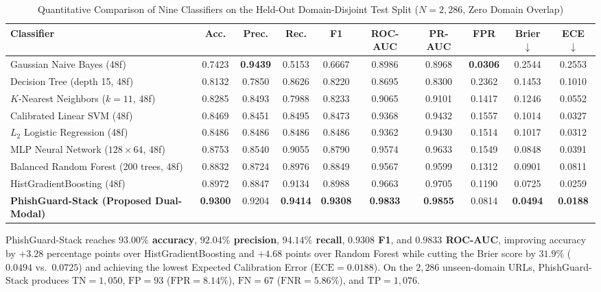 \documentclass[conference]{IEEEtran}
\begin{document}
\begin{table}[t]
\caption{Quantitative Comparison of Nine Classifiers on the Held-Out Domain-Disjoint Test Split ($N = 2{,}286$, Zero Domain Overlap)}
\label{tab:classifiers}
\centering
\footnotesize
\renewcommand{\arraystretch}{1.14}
\begin{tabular}{lccccccccc}
\toprule
\textbf{Classifier} & \textbf{Acc.} & \textbf{Prec.} & \textbf{Rec.} & \textbf{F1} & \textbf{ROC-AUC} & \textbf{PR-AUC} & \textbf{FPR} & \textbf{Brier $\downarrow$} & \textbf{ECE $\downarrow$} \\
\midrule
Gaussian Naive Bayes (48f) & 0.7423 & \textbf{0.9439} & 0.5153 & 0.6667 & 0.8986 & 0.8968 & \textbf{0.0306} & 0.2544 & 0.2553 \\
Decision Tree (depth 15, 48f) & 0.8132 & 0.7850 & 0.8626 & 0.8220 & 0.8695 & 0.8300 & 0.2362 & 0.1453 & 0.1010 \\
$K$-Nearest Neighbors ($k=11$, 48f) & 0.8285 & 0.8493 & 0.7988 & 0.8233 & 0.9065 & 0.9101 & 0.1417 & 0.1246 & 0.0552 \\
Calibrated Linear SVM (48f) & 0.8469 & 0.8451 & 0.8495 & 0.8473 & 0.9368 & 0.9432 & 0.1557 & 0.1014 & 0.0327 \\
$L_2$ Logistic Regression (48f) & 0.8486 & 0.8486 & 0.8486 & 0.8486 & 0.9362 & 0.9430 & 0.1514 & 0.1017 & 0.0312 \\
MLP Neural Network ($128\times 64$, 48f) & 0.8753 & 0.8540 & 0.9055 & 0.8790 & 0.9574 & 0.9633 & 0.1549 & 0.0848 & 0.0391 \\
Balanced Random Forest (200 trees, 48f) & 0.8832 & 0.8724 & 0.8976 & 0.8849 & 0.9567 & 0.9599 & 0.1312 & 0.0901 & 0.0811 \\
HistGradientBoosting (48f) & 0.8972 & 0.8847 & 0.9134 & 0.8988 & 0.9663 & 0.9705 & 0.1190 & 0.0725 & 0.0259 \\
\midrule
\textbf{PhishGuard-Stack (Proposed Dual-Modal)} & \textbf{0.9300} & 0.9204 & \textbf{0.9414} & \textbf{0.9308} & \textbf{0.9833} & \textbf{0.9855} & 0.0814 & \textbf{0.0494} & \textbf{0.0188} \\
\bottomrule
\end{tabular}
\end{table}

PhishGuard-Stack reaches \textbf{$93.00\%$ accuracy}, \textbf{$92.04\%$ precision}, \textbf{$94.14\%$ recall}, \textbf{$0.9308$ F1}, and \textbf{$0.9833$ ROC-AUC}, improving accuracy by $+3.28$ percentage points over HistGradientBoosting and $+4.68$ points over Random Forest while cutting the Brier score by $31.9\%$ ($0.0494$ vs.\ $0.0725$) and achieving the lowest Expected Calibration Error ($\text{ECE}=0.0188$). On the $2{,}286$ unseen-domain URLs, PhishGuard-Stack produces $\text{TN}=1{,}050$, $\text{FP}=93$ ($\text{FPR}=8.14\%$), $\text{FN}=67$ ($\text{FNR}=5.86\%$), and $\text{TP}=1{,}076$.
\end{document}

